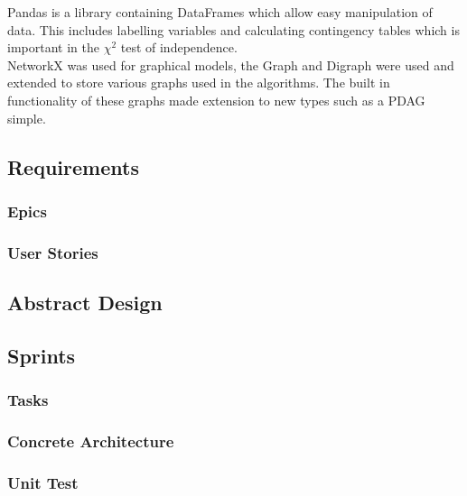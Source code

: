 \documentclass{article}
\begin{document}
Pandas is a library containing DataFrames which allow easy manipulation of data. This includes labelling variables and calculating contingency tables which is important in the $\chi^2$ test of independence.\\

NetworkX was used for graphical models, the Graph and Digraph were used and extended to store various graphs used in the algorithms. The built in functionality of these graphs made extension to new types such as a PDAG simple.\\

\subsection{Requirements}
\subsubsection{Epics}
\subsubsection{User Stories}

\subsection{Abstract Design}

\subsection{Sprints}
\subsubsection{Tasks}
\subsubsection{Concrete Architecture}
\subsubsection{Unit Test}
\end{document}
